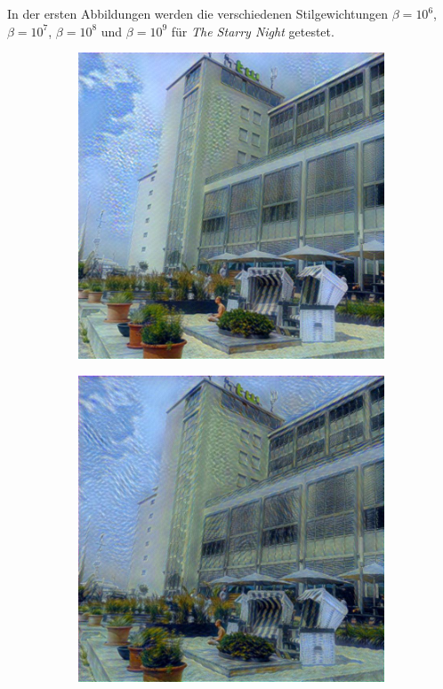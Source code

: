 In der ersten Abbildungen werden die verschiedenen
Stilgewichtungen $ \beta = 10^{6} $, $ \beta = 10^{7} $, $ \beta = 10^{8} $ und $ \beta = 10^{9} $ für \textit{The Starry Night} getestet.

\begin{figure}[H]
    \centering
    \begin{subfigure}[h]{0.24\textwidth}
        \centering
        \includegraphics[width=\textwidth]{resources/content/experiments/a__starry_night__768x768__style-weight_1e+06__tv-weight_0e+00.jpg}
    \end{subfigure}
    \begin{subfigure}[h]{0.24\textwidth}
        \centering
        \includegraphics[width=\textwidth]{resources/content/experiments/a__starry_night__768x768__style-weight_1e+07__tv-weight_0e+00.jpg}

\end{subfigure}
\end{figure}
